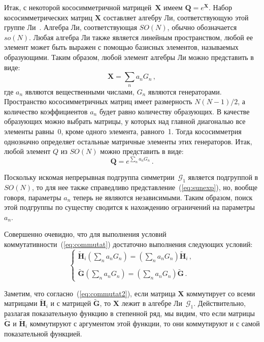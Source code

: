 {Итак, с некоторой кососимметричной матрицей~$\textbf{X}$ имеем $\textbf{Q}=e^\textbf{X}$. Набор кососимметрических матриц $\textbf{X}$ составляет алгебру Ли, соответствующую этой группе Ли~\cite{Zhelobenko}. Алгебра Ли, соответствующая $SO(N)$, обычно обозначается $so(N)$. Любая алгебра Ли также является линейным пространством, любой ее элемент может быть выражен с помощью базисных элементов, называемых образующими. Таким образом, любой элемент алгебры Ли можно представить в виде:
%
\begin{equation}
\textbf{X} = \sum_n a_n G_n \, ,
\end{equation}
%
где $ a_n $ являются вещественными числами, $G_n $ являются генераторами. Пространство кососимметричных матриц имеет размерность $N(N-1)/2$, а количество коэффициентов $a_n$ будет равно количеству образующих. В качестве образующих можно выбрать матрицы, у которых над главной диагональю все элементы равны~0, кроме одного элемента, равного~1. Тогда кососимметрия однозначно определяет остальные матричные элементы этих генераторов. Итак, любой элемент $Q$ из $SO(N)$ можно представить в виде:
%
\begin{equation}
\label{eq:sunexp}
\textbf{Q}=e^{\sum_n a_n G_n} \, .
\end{equation}
%

Поскольку искомая непрерывная подгруппа симметрии~$\mathcal{G}_1$ является подгруппой в $SO(N)$, то для нее также справедливо представление~(\ref{eq:sunexp}), но, вообще говоря, параметры $ a_n$ теперь не являются независимыми. Таким образом, поиск этой подгруппы по существу сводится к нахождению ограничений на параметры $a_n$.

Совершенно очевидно, что для выполнения условий коммутативности~(\ref{eq:commutat}) достаточно выполнения следующих условий:
%
\begin{equation}
\label{eq:commutat2}
\left\{
\begin{array}{l}
\displaystyle
\tilde{\textbf{H}}_i \left(\sum\limits_na_nG_n\right) =
\left(\sum\limits_na_nG_n\right) \tilde{\textbf{H}}_i \, , \\ \\
\displaystyle
\tilde{\textbf{G}} \left(\sum\limits_na_nG_n\right) = \left(\sum\limits_na_nG_n\right) \tilde{\textbf{G}} \, .
\end{array}
\right.
\end{equation}
%

Заметим, что согласно~(\ref{eq:commutat2}), если матрица $\textbf{X}$ коммутирует со всеми матрицами $\tilde{\textbf{H}}_i$ и с матрицей $\tilde{\textbf{G}}$, то $\textbf{X}$ лежит в алгебре Ли~$ \mathcal{G}_1$.
Действительно, разлагая показательную функцию в степенной ряд, мы видим, что если матрицы $\tilde{\textbf{G}}$ и $\tilde{\textbf{H}}_i$ коммутируют с аргументом этой функции, то они коммутируют и с самой показательной функцией.

}
